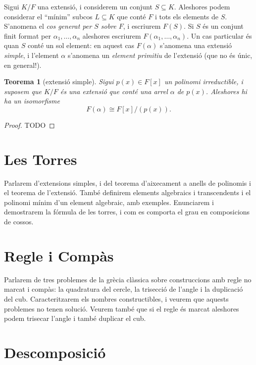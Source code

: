\documentclass[
]{book}
\newtheorem{theorem}{Teorema}[chapter]
\theoremstyle{definition}
\theoremstyle{definition}
\theoremstyle{definition}
\theoremstyle{definition}
\theoremstyle{remark}
\begin{document}
Sigui \(K/F\) una extensió, i considerem un conjunt \(S\subseteq K\). Aleshores podem considerar el ``mínim'' subcos \(L\subseteq K\)
que conté \(F\) i tots els elements de \(S\). S'anomena el \emph{cos generat per \(S\) sobre \(F\)}, i escriurem \(F(S)\). Si \(S\) és un
conjunt finit format per \(\alpha_1,\ldots,\alpha_n\) aleshores escriurem \(F(\alpha_1,\ldots,\alpha_n)\). Un cas particular
és quan \(S\) conté un sol element: en aquest cas \(F(\alpha)\) s'anomena una extensió \emph{simple}, i l'element \(\alpha\) s'anomena
un \emph{element primitiu} de l'extensió (que no és únic, en general!).

\begin{theorem}[extensió simple]
\protect\hypertarget{thm:ext-simple}{}\label{thm:ext-simple}Sigui \(p(x)\in F[x]\) un polinomi irreductible, i suposem que \(K/F\) és una extensió que conté una arrel \(\alpha\) de \(p(x)\).
Aleshores hi ha un isomorfisme \[F(\alpha) \cong F[x]/(p(x)).\]
\end{theorem}

\begin{proof}
TODO
\end{proof}

\hypertarget{les-torres}{%
\chapter{Les Torres}\label{les-torres}}

Parlarem d'extensions simples, i del teorema d'aixecament a anells de polinomis i el teorema de l'extensió.
També definirem elements algebraics i transcendents i el polinomi mínim d'un element algebraic, amb exemples.
Enunciarem i demostrarem la fórmula de les torres, i com es comporta el grau en composicions de cossos.

\hypertarget{regle-i-compuxe0s}{%
\chapter{Regle i Compàs}\label{regle-i-compuxe0s}}

Parlarem de tres problemes de la grècia clàssica sobre construccions amb regle no marcat i compàs: la quadratura del cercle,
la trisecció de l'angle i la duplicació del cub. Caracteritzarem els nombres constructibles, i veurem que aquests problemes
no tenen solució. Veurem també que si el regle és marcat aleshores podem trisecar l'angle i també duplicar el cub.

\hypertarget{descomposiciuxf3}{%
\chapter{Descomposició}\label{descomposiciuxf3}}
\end{document}
